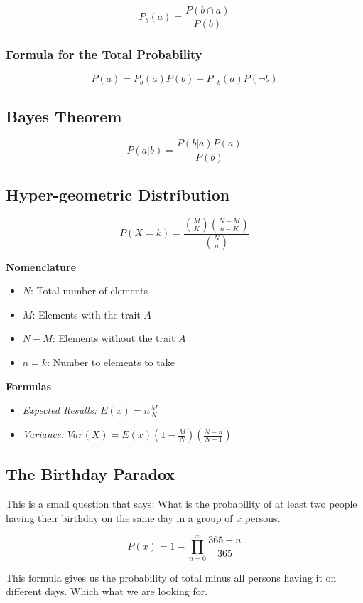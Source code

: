 \[P_b (a) = \frac{P(b \cap a)}{P(b)}\]

\subsubsection{Formula for the Total Probability}

\[P(a) = P_b (a) P(b) + P_{\neg b}(a) P(\neg b)\]

\subsection{Bayes Theorem}

\[P(a | b) = \frac{P(b | a) P(a)}{P(b)}\]

\subsection{Hyper-geometric Distribution}

\[P(X = k) = \frac{\binom{M}{K} \binom{N - M}{n - K}}{\binom{N}{n}}\]

\textbf{Nomenclature}
\begin{itemize}[label=\(-\)]
    \item \(N\): Total number of elements
    \item \(M\): Elements with the trait \(A\)
    \item \(N - M\): Elements without the trait \(A\)
    \item \(n = k\): Number to elements to take
\end{itemize}

\textbf{Formulas }
\begin{itemize}[label=\(-\)]
    \item \emph{Expected Results: } \(E(x) = n \frac{M}{N}\)
    \item \emph{Variance: } \(Var(X) = E(x)\left(1 - \frac{M}{N}\right) \left(\frac{N - n}{N - 1}\right)\)
\end{itemize}

\subsection{The Birthday Paradox}

This is a small question that says: What is the probability of at least two people having 
their birthday on the same day in a group of \(x\) persons.

\[
P(x) = 1 - \prod_{n = 0}^{x} \frac{365 - n}{365}
\]

This formula gives us the probability of total minus all persons having it on different days. Which
what we are looking for.